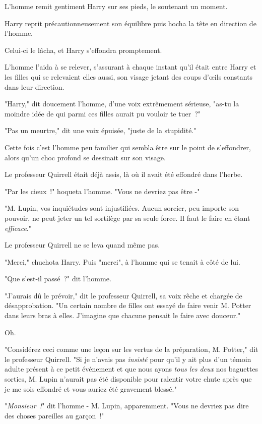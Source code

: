 L'homme remit gentiment Harry sur ses pieds, le soutenant un moment.

Harry reprit précautionneusement son équilibre puis hocha la tête en direction de l'homme.

Celui-ci le lâcha, et Harry s'effondra promptement.

L'homme l'aida à se relever, s'assurant à chaque instant qu'il était entre Harry et les filles qui se relevaient elles aussi, son visage jetant des coups d'œils constants dans leur direction.

"Harry," dit doucement l'homme, d'une voix extrêmement sérieuse, "as-tu la moindre idée de qui parmi ces filles aurait pu vouloir te tuer~?"

"Pas un meurtre," dit une voix épuisée, "juste de la stupidité."

Cette fois c'est l'homme peu familier qui sembla être sur le point de s'effondrer, alors qu'un choc profond se dessinait sur son visage.

Le professeur Quirrell était déjà assis, là où il avait été effondré dans l'herbe.

"Par les cieux~!" hoqueta l'homme. "Vous ne devriez pas être -"

"M. Lupin, vos inquiétudes sont injustifiées. Aucun sorcier, peu importe son pouvoir, ne peut jeter un tel sortilège par sa seule force. Il faut le faire en étant \emph{efficace}."

Le professeur Quirrell ne se leva quand même pas.

"Merci," chuchota Harry. Puis "merci", à l'homme qui se tenait à côté de lui.

"Que s'est-il passé~?" dit l'homme.

"J'aurais dû le prévoir," dit le professeur Quirrell, sa voix rêche et chargée de désapprobation. "Un certain nombre de filles ont essayé de faire venir M. Potter dans leurs bras à elles. J'imagine que chacune pensait le faire avec douceur."

Oh.

"Considérez ceci comme une leçon sur les vertus de la préparation, M. Potter," dit le professeur Quirrell. "Si je n'avais pas \emph{insisté} pour qu'il y ait plus d'un témoin adulte présent à ce petit événement et que nous ayons \emph{tous les deux} nos baguettes sorties, M. Lupin n'aurait pas été disponible pour ralentir votre chute après que je me sois effondré et vous auriez été gravement blessé."

"\emph{Monsieur~!}" dit l'homme - M. Lupin, apparemment. "Vous ne devriez pas dire des choses pareilles au garçon~!"

